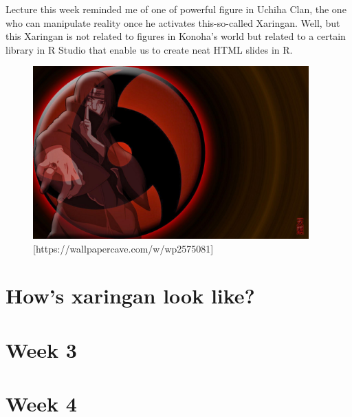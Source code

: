 \documentclass[
  letterpaper,
  DIV=11,
  numbers=noendperiod]{scrreprt}
\begin{document}
Lecture this week reminded me of one of powerful figure in Uchiha Clan,
the one who can manipulate reality once he activates this-so-called
Xaringan. Well, but this Xaringan is not related to figures in Konoha's
world but related to a certain library in R Studio that enable us to
create neat HTML slides in R.

\begin{figure}

{\centering \includegraphics[width=4.17708in,height=\textheight]{images/wp2575081-itachi-sharingan-wallpaper.jpg}

}

\caption{{[}https://wallpapercave.com/w/wp2575081{]}}

\end{figure}


\hypertarget{hows-xaringan-look-like}{%
\chapter{How's xaringan look like?}\label{hows-xaringan-look-like}}


\hypertarget{week-3}{%
\chapter{Week 3}\label{week-3}}


\hypertarget{week-4}{%
\chapter{Week 4}\label{week-4}}
\end{document}
